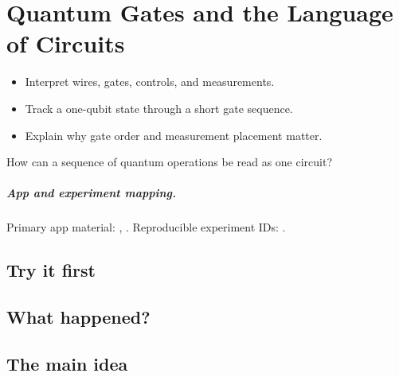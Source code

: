 \chapter[Quantum Gates and Circuits]{Quantum Gates and the Language of Circuits}
\label{chap:quantum-gates-and-the-language-of-circuits}

\begin{learningobjectives}
\begin{itemize}
  \item Interpret wires, gates, controls, and measurements.
  \item Track a one-qubit state through a short gate sequence.
  \item Explain why gate order and measurement placement matter.
\end{itemize}
\end{learningobjectives}

\begin{openingquestion}
How can a sequence of quantum operations be read as one circuit?
\end{openingquestion}

\paragraph{App and experiment mapping.}
Primary app material: , . Reproducible experiment IDs:
.

\section{Try it first}
\begin{tryit}
\end{tryit}

\section{What happened?}

\section{The main idea}
\begin{coreidea}
\end{coreidea}

